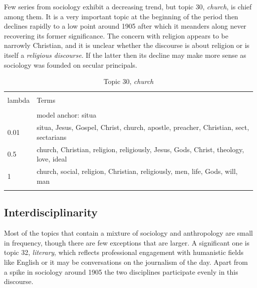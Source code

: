 \documentclass[]{book}
\theoremstyle{definition}
\theoremstyle{definition}
\theoremstyle{definition}
\theoremstyle{remark}
\begin{document}
Few series from sociology exhibit a decreasing trend, but topic 30,
\emph{church}, is chief among them. It is a very important topic at the
beginning of the period then declines rapidly to a low point around 1905
after which it meanders along never recovering its former significance.
The concern with religion appears to be narrowly Christian, and it is
unclear whether the discourse is about religion or is itself a
\emph{religious discourse}. If the latter then its decline may make more
sense as sociology was founded on secular principals.



\begin{table}[!htbp] \centering 
  \caption{Topic 30, \emph{church}} 
  \label{tab:t30-s} 
\begin{tabularx}{\textwidth}{@{\extracolsep{5pt}} lY} 
\\[-1.8ex]\hline 
\hline \\[-1.8ex] 
lambda & Terms \\ 
\hline \\[-1.8ex] 
 & model anchor: situa \\ 
0.01 & situa, Jesus, Gospel, Christ, church, apostle, preacher, Christian, sect, sectarians \\ 
0.5 & church, Christian, religion, religiously, Jesus, Gods, Christ, theology, love, ideal \\ 
1 & church, social, religion, Christian, religiously, men, life, Gods, will, man \\ 
\hline \\[-1.8ex] 
\end{tabularx} 
\end{table}

\hypertarget{interdisciplinarity}{%
\subsection{Interdisciplinarity}\label{interdisciplinarity}}

Most of the topics that contain a mixture of sociology and anthropology
are small in frequency, though there are few exceptions that are larger.
A significant one is topic 32, \emph{literary}, which reflects
professional engagement with humanistic fields like English or it may be
conversations on the journalism of the day. Apart from a spike in
sociology around 1905 the two disciplines participate evenly in this
discourse.
\end{document}
